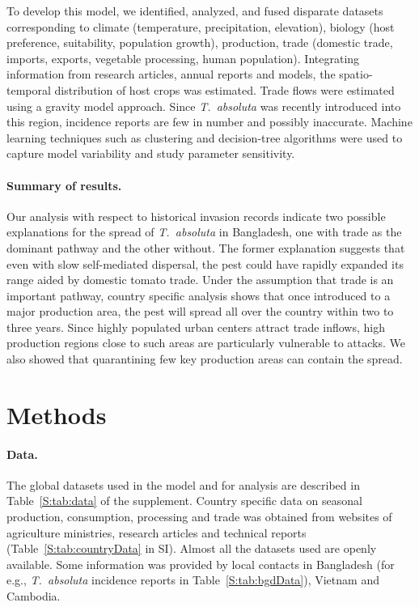 \documentclass[11pt]{article}
\newcommand{\tuta}{\emph{T.~absoluta}}
\theoremstyle{definition}
\begin{document}
To develop this model, we identified, analyzed, and fused disparate
datasets corresponding to climate (temperature, precipitation, elevation),
biology (host preference, suitability, population growth), production,
trade (domestic trade, imports, exports, vegetable processing, human
population). Integrating information from
research articles, annual reports and models, the spatio-temporal
distribution of host crops was estimated. Trade flows were estimated using
a gravity model approach. Since \tuta{} was recently introduced into this
region, incidence reports are few in number and possibly inaccurate.
Machine learning techniques such as clustering and decision-tree algorithms
were used to capture model variability and study parameter sensitivity.

\paragraph{Summary of results.} 
Our analysis with respect to historical invasion records indicate two
possible explanations for the spread of \tuta{} in Bangladesh, one with
trade as the dominant pathway and the other without. The former explanation
suggests that even with slow self-mediated dispersal, the pest could have
rapidly expanded its range aided by domestic tomato trade. Under the
assumption that trade is an important pathway, country specific analysis
shows that once introduced to a major production area, the pest will spread
all over the country within two to three years. Since highly populated
urban centers attract trade inflows, high production regions close to such
areas are particularly vulnerable to attacks. We also showed that
quarantining few key production areas can contain the spread.

\section{Methods}
\paragraph{Data.} The global datasets used in the model and for analysis are
described in Table~\ref{S:tab:data} of the supplement. Country specific data on
seasonal production, consumption, processing and trade was
obtained from websites of agriculture ministries, research articles and technical
reports (Table~\ref{S:tab:countryData} in SI). Almost
all the datasets used are openly available. Some information was
provided by local contacts in Bangladesh (for e.g., \tuta{} incidence
reports in Table~\ref{S:tab:bgdData}), Vietnam and Cambodia.
\end{document}
